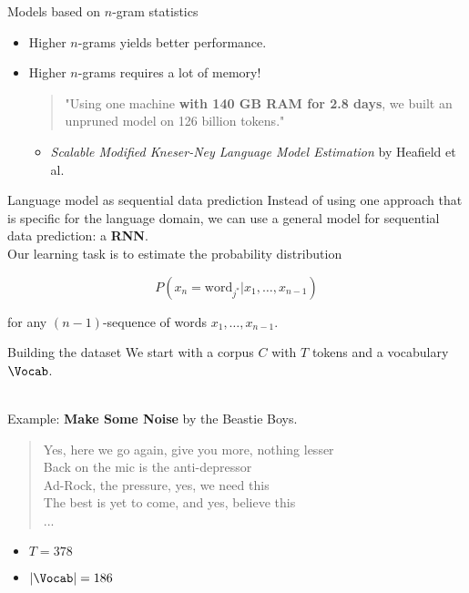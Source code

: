 \documentclass[10pt]{beamer}
\begin{document}
\begin{frame}{Models based on $n$-gram statistics}
\begin{itemize}
\item Higher $n$-grams yields better performance.
\vspace{0.7cm}
\item Higher $n$-grams requires a lot of memory!
\vspace{0.1cm}
\begin{quote}
"Using one machine \textbf{with 140 GB
RAM for 2.8 days}, we built an unpruned
model on 126 billion tokens."
\end{quote}
\begin{itemize}
\item [] \textit{Scalable Modified Kneser-Ney Language Model Estimation} by Heafield et al.
\end{itemize}
\end{itemize}
\end{frame}



\begin{frame}{Language model as sequential data prediction}
Instead of using one approach that is specific for the language domain, we can use a general model for sequential data prediction: a \textbf{RNN}. \\

Our learning task is to estimate the probability distribution 

\[
P(x_{n} = \text{word}_{j^{*}} | x_{1}, \dots ,x_{n-1})
\]

for any $(n-1)$-sequence of words $x_{1}, \dots ,x_{n-1}$.
\end{frame}

\begin{frame}{Building the dataset}
We start with a corpus $C$ with $T$ tokens and a vocabulary $\Vocab$.\\\

Example: \textbf{Make Some Noise} by the Beastie Boys.\\

\begin{quote}
\alert{Yes, here we go again, give you more, nothing lesser\\
Back on the mic is the anti-depressor\\
Ad-Rock, the pressure, yes, we need this\\
The best is yet to come, and yes, believe this\\
... \\}
\end{quote}

\begin{itemize}
\item $T = 378$
\item $|\Vocab| = 186$
\end{itemize}

\end{frame}
\end{document}
